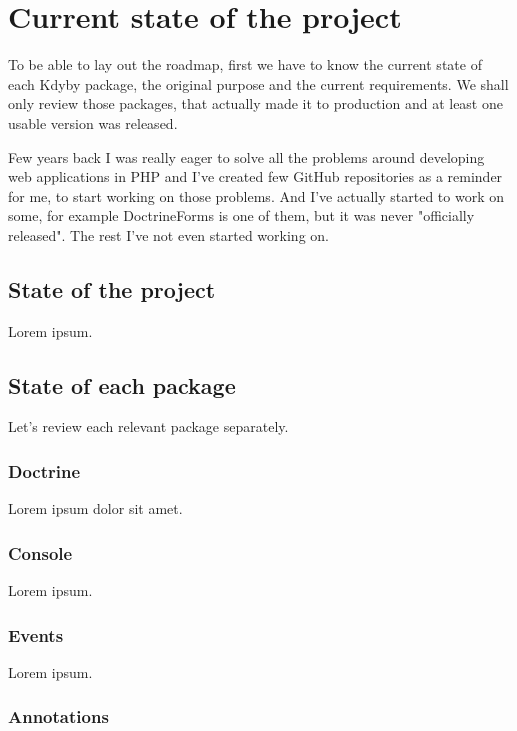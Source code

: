 \chapter{Current state of the project}

To be able to lay out the roadmap, first we have to know the current state of each Kdyby package, the original purpose and the current requirements. We shall only review those packages, that actually made it to production and at least one usable version was released.

Few years back I was really eager to solve all the problems around developing web applications in PHP and I've created few GitHub repositories as a reminder for me, to start working on those problems. And I've actually started to work on some, for example DoctrineForms is one of them, but it was never "officially released". The rest I've not even started working on.

\section{State of the project}

Lorem ipsum.

\section{State of each package}

Let's review each relevant package separately.

\subsection{Doctrine}

Lorem ipsum dolor sit amet.

\subsection{Console}

Lorem ipsum.

\subsection{Events}

Lorem ipsum.

\subsection{Annotations}

